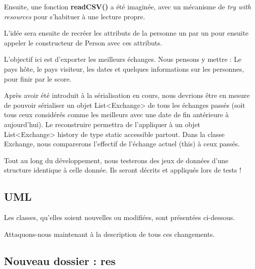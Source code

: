 \documentclass{mytex}
\begin{document}
Ensuite, une fonction \textbf{readCSV()} a été imaginée, avec un mécanisme de \textit{try with resources} pour s'habituer à une lecture propre.

L'idée sera ensuite de recréer les attributs de la personne un par un pour ensuite appeler le constructeur de Person avec ces attributs.


L'objectif ici est d'exporter les meilleurs échanges.
Nous pensons y mettre : Le pays hôte, le pays visiteur, les dates et quelques informations sur les personnes, pour finir par le score.


Après avoir été introduit à la sérialisation en cours, nous devrions être en mesure de pouvoir sérialiser un objet List<Exchange> de tous les échanges passés (soit tous ceux considérés comme les meilleurs avec une date de fin antérieure à aujourd'hui). Le reconstruire permettra de l'appliquer à un objet List<Exchange> history de type static accessible partout. Dans la classe Exchange, nous comparerons l'effectif de l'échange actuel (this) à ceux passés.


Tout au long du développement, nous testerons des jeux de données d'une structure identique à celle donnée. Ils seront décrits et appliqués lors de tests !

\subsection{UML}

Les classes, qu'elles soient nouvelles ou modifiées, sont présentées ci-dessous.


Attaquons-nous maintenant à la description de tous ces changements.



\subsection{Nouveau dossier : res}
\end{document}

